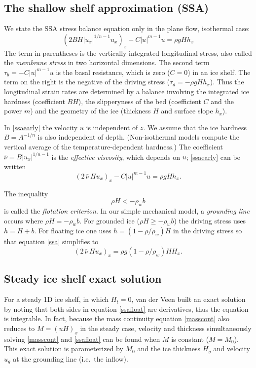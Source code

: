 \documentclass[letterpaper,final,12pt,reqno]{amsart}
\begin{document}
\subsection*{The shallow shelf approximation (SSA)}  We state the SSA stress balance equation only in the plane flow, isothermal case:
\begin{equation}
  \left(2 B H |u_x|^{1/n - 1} u_x\right)_x - C|u|^{m-1}u = \rho g H h_x \label{ssaearly}
\end{equation}
The term in parentheses is the vertically-integrated longitudinal stress, also called the \emph{membrane stress} in two horizontal dimensions.  The second term $\tau_b = - C|u|^{m-1}u$ is the basal resistance, which is zero ($C=0$) in an ice shelf.  The term on the right is the negative of the driving stress ($\tau_d = - \rho g H h_x$).  Thus the longitudinal strain rates are determined by a balance involving the integrated ice hardness (coefficient $BH$), the slipperyness of the bed (coefficient $C$ and the power $m$) and the geometry of the ice (thickness $H$ and surface slope $h_x$).

In \eqref{ssaearly} the velocity $u$ is independent of $z$.  We assume that the ice hardness $B=A^{-1/n}$ is also independent of depth.  (Non-isothermal models compute the vertical average of the temperature-dependent hardness.)  The coefficient $\bar \nu = B |u_x|^{1/n-1}$ is the \emph{effective viscosity}, which depends on $u$; \eqref{ssaearly} can be written
\begin{equation}
  \left(2 \,\bar \nu\, H u_x\right)_x - C |u|^{m-1} u = \rho g H h_x.  \label{ssa}
\end{equation}

The inequality
\begin{equation}
\rho H < - \rho_w b     \label{flotation}
\end{equation}
is called the \emph{flotation criterion}.  In our simple mechanical model, a \emph{grounding line} occurs where $\rho H = - \rho_w b$.  For grounded ice ($\rho H \ge - \rho_w b$) the driving stress uses $h = H+b$.  For floating ice one uses $h = (1-\rho/\rho_w) H$ in the driving stress so that equation \eqref{ssa} simplifies to
\begin{equation}
   \left(2 \,\bar\nu\, H u_x\right)_x = \rho g (1-\rho/\rho_w) H H_x. \label{ssafloat}
\end{equation}

\subsection*{Steady ice shelf exact solution}  For a steady 1D ice shelf, in which $H_t=0$, van der Veen \cite{vanderVeen83} built an exact solution by noting that both sides in equation \eqref{ssafloat} are derivatives, thus the equation is integrable.  In fact, because the mass continuity equation \eqref{masscont} also reduces to $M=(uH)_x$ in the steady case, velocity and thickness simultaneously solving \eqref{masscont} and \eqref{ssafloat} can be found when $M$ is constant ($M=M_0$).  This exact solution is parameterized by $M_0$ and the ice thickness $H_g$ and velocity $u_g$ at the grounding line (i.e.~the inflow).
\end{document}
